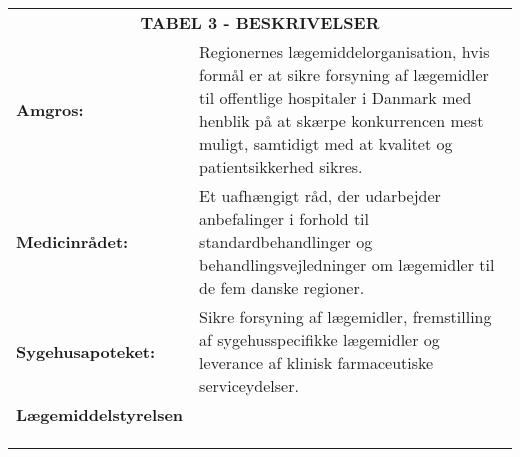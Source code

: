 \begin{table}[H]
\label{table:beskrivelser}
\vspace{0.5cm}
\begin{tabular}{p{4.5cm} p{9.8cm}}
\multicolumn{2}{c}{\cellcolor[HTML]{C0C0C0}\textbf{TABEL 3 - BESKRIVELSER}} \vspace{0.5cm} \\
\textbf{Amgros:} & Regionernes lægemiddelorganisation, hvis formål er at sikre forsyning af lægemidler til offentlige hospitaler i Danmark med henblik på at skærpe konkurrencen mest muligt, samtidigt med at kvalitet og patientsikkerhed sikres. \vspace{0.5cm}
\\ 
\textbf{Medicinrådet:} & Et uafhængigt råd, der udarbejder anbefalinger i forhold til standardbehandlinger og behandlingsvejledninger om lægemidler til de fem danske regioner. \vspace{0.5cm} \\
\textbf{Sygehusapoteket:} & Sikre forsyning af lægemidler,
fremstilling af sygehusspecifikke lægemidler og leverance af klinisk farmaceutiske serviceydelser. \vspace{0.5cm} \\
\textbf{Lægemiddelstyrelsen} & \vspace{0.5cm} \\
& \vspace{0.5cm} \\
& \vspace{0.5cm} \\
& \vspace{0.5cm} \\
\end{tabular}
\end{table}




